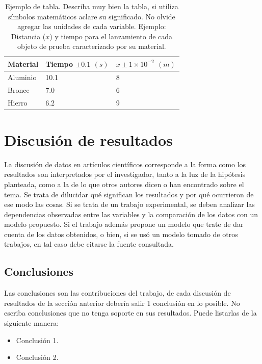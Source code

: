 \documentclass{estilos}
\begin{document}
\begin{table}[H]
\centering
\caption{Ejemplo de tabla. Describa muy bien la tabla, si utiliza símbolos matemáticos aclare su significado. No olvide agregar las unidades de cada variable. Ejemplo: Distancia ($x$) y tiempo para el lanzamiento de cada objeto de prueba caracterizado por su material.}
\label{mitabla}
\begin{tabular}{|l|l|l|}
\hline
Material& Tiempo $\pm 0.1$ $(s)$& $x \pm 1 \times 10^{-2} $ $(m)$ \\ \hline
Aluminio                      & 10.1               & 8                                                 \\ \hline
Bronce                        & 7.0                & 6                                                 \\ \hline
Hierro                        & 6.2                & 9                                                 \\ \hline
\end{tabular}
\end{table}

\section*{Discusión de resultados}
La discusión de datos en artículos científicos corresponde
a la forma como los resultados son interpretados por el
investigador, tanto a la luz de la hipótesis planteada, como
a la de lo que otros autores dicen o han encontrado sobre
el tema. Se trata de dilucidar qué significan los resultados
y por qué ocurrieron de ese modo las cosas. Si se trata de un trabajo experimental, se deben analizar
las dependencias observadas entre las variables y la comparación de los datos con un modelo
propuesto. Si el trabajo además propone un modelo que trate de dar cuenta
de los datos obtenidos, o bien, si se usó un modelo tomado de otros trabajos,
en tal caso debe citarse la fuente consultada.


\subsection*{Conclusiones}
Las conclusiones son las contribuciones del trabajo, de cada discusión de resultados
de la sección anterior debería salir 1 conclusión en lo posible. No escriba conclusiones
que no tenga soporte en sus resultados. Puede listarlas de la siguiente manera:
\begin{itemize}
\item Conclusión 1.
\item Conclusión 2.
\end{itemize}



\end{document}
